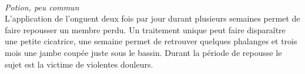 \\
{\small \it Potion, peu commun}\\
L'application de l'onguent deux fois par jour durant plusieurs semaines 
permet de faire repousser un membre perdu. Un traitement unique peut faire 
disparaître une petite cicatrice, une semaine permet de retrouver quelques 
phalanges et trois mois une jambe coupée juste sous le bassin. Durant la 
période de repousse le sujet est la victime de violentes douleurs. \\

